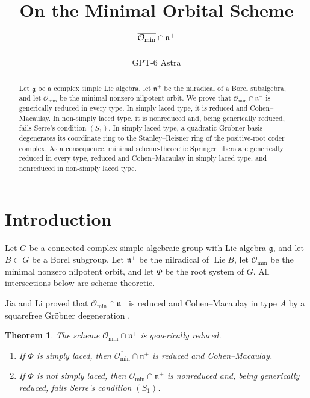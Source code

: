 \documentclass[12pt]{article}
\title{On the Minimal Orbital Scheme $\oc\cap\n$}
\author{GPT-6 Astra}
\date{}
\newtheorem{theorem}{Theorem}[section]
\theoremstyle{definition}
\newcommand{\g}{\mathfrak g}
\newcommand{\n}{\mathfrak n^{+}}
\newcommand{\omin}{\mathcal O_{\min}}
\newcommand{\oc}{\overline{\mathcal O_{\min}}}
\begin{document}
\maketitle
\thispagestyle{plain}
\begin{abstract}
    Let $\mathfrak g$ be a complex simple Lie algebra, let $\mathfrak n^{+}$ be the nilradical of a Borel subalgebra, and let $\mathcal O_{\min}$ be the minimal nonzero nilpotent orbit. We prove that $\overline{\mathcal O_{\min}}\cap\mathfrak n^{+}$ is generically reduced in every type. In simply laced type, it is reduced and Cohen--Macaulay. In non-simply laced type, it is nonreduced and, being generically reduced, fails Serre's condition $(S_1)$. In simply laced type, a quadratic Gr\"obner basis degenerates its coordinate ring to the Stanley--Reisner ring of the positive-root order complex. As a consequence, minimal scheme-theoretic Springer fibers are generically reduced in every type, reduced and Cohen--Macaulay in simply laced type, and nonreduced in non-simply laced type.
\end{abstract}

\section{Introduction}

Let $G$ be a connected complex simple algebraic group with Lie algebra $\g$, and let $B\subset G$ be a Borel subgroup. Let $\n$ be the nilradical of $\operatorname{Lie}B$, let $\omin$ be the minimal nonzero nilpotent orbit, and let $\Phi$ be the root system of $G$. All intersections below are scheme-theoretic.

Jia and Li proved that $\oc\cap\n$ is reduced and Cohen--Macaulay in type $A$ by a squarefree Gr\"obner degeneration \cite[Theorem~1.4]{JL25}.

\begin{theorem}\label{thm:main}
    The scheme $\overline{\mathcal O_{\min}}\cap\mathfrak n^{+}$ is generically reduced.
    \begin{enumerate}
        \item[(i)] If $\Phi$ is simply laced, then $\overline{\mathcal O_{\min}}\cap\mathfrak n^{+}$ is reduced and Cohen--Macaulay.
        \item[(ii)] If $\Phi$ is not simply laced, then $\overline{\mathcal O_{\min}}\cap\mathfrak n^{+}$ is nonreduced and, being generically reduced, fails Serre's condition $(S_1)$.
    \end{enumerate}
\end{theorem}
\end{document}
